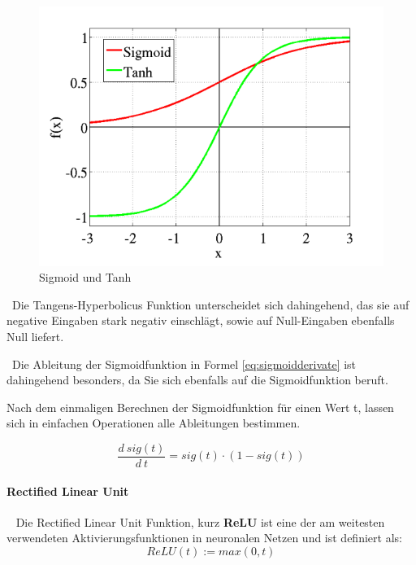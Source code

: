 \begin{figure}[h]
	\begin{center}
		\includegraphics[width=0.65\linewidth]{Bilder/sigmoidtanhplot}
		\caption[Sigmoid und Tanh:\newline \tiny \url{
			https://towardsdatascience.com/activation-functions-neural-networks-1cbd9f8d91d6}\normalsize]{Sigmoid und Tanh}
		\label{fig:SigTanh}
	\end{center}
\end{figure}  

~\newline Die Tangens-Hyperbolicus Funktion unterscheidet sich dahingehend, das sie auf negative Eingaben stark negativ einschlägt, sowie auf Null-Eingaben ebenfalls Null liefert. 

~\newline Die Ableitung der Sigmoidfunktion in Formel \ref{eq:sigmoidderivate} ist dahingehend besonders, da Sie sich ebenfalls auf die Sigmoidfunktion beruft. 

Nach dem einmaligen Berechnen der Sigmoidfunktion für einen Wert t, lassen sich in einfachen Operationen alle Ableitungen bestimmen. 

\begin{equation}
	\label{eq:sigmoidderivate}
	\dfrac{d \ sig(t)}{d \ t} = sig(t) \cdot (1 - sig(t))
\end{equation}  
\paragraph{Rectified Linear Unit}~\newline
Die Rectified Linear Unit Funktion, kurz \textbf{ReLU} ist eine der am weitesten verwendeten Aktivierungsfunktionen in neuronalen Netzen und ist definiert als: 
\begin{equation}
\label{eq:ReLU}
ReLU(t) := max(0,t)
\end{equation}

